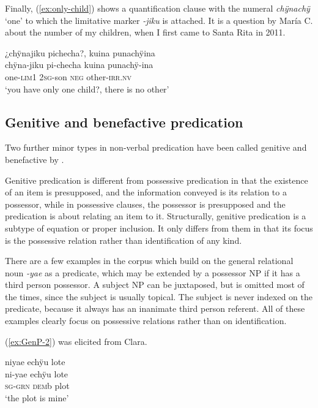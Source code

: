 Finally, (\ref{ex:only-child}) shows a quantification clause with the numeral \textit{chÿnachÿ} ‘one’ to which the limitative marker \textit{-jiku} is attached. It is a question by María C. about the number of my children, when I first came to Santa Rita in 2011.

\ea\label{ex:only-child}
\begingl
\glpreamble ¿chÿnajiku pichecha?, kuina punachÿina\\
\gla chÿna-jiku pi-checha kuina punachÿ-ina\\
\glb one-\textsc{lim}1 2\textsc{sg}-son \textsc{neg} other-\textsc{irr.nv}\\
\glft ‘you have only one child?, there is no other’
\endgl
\trailingcitation{[uxx-p110825l.242-244]}
\xe
{}


\subsection{Genitive and benefactive predication}\label{sec:GenitiveBenfactivePreds}

Two further minor types in non-verbal predication have been called genitive and benefactive by \citet[248]{Dryer2007}.

Genitive predication is different from possessive predication in that the existence of an item is presupposed, and the information conveyed is its relation to a possessor, while in possessive clauses, the possessor is presupposed and the predication is about relating an item to it. Structurally, genitive predication is a subtype of equation or proper inclusion. It only differs from them in that its focus is the possessive relation rather than identification of any kind.

There are a few examples in the corpus which build on the general relational noun \textit{-yae} as a predicate, which may be extended by a possessor NP if it has a third person possessor. A subject NP can be juxtaposed, but is omitted most of the times, since the subject is usually topical. The subject is never indexed on the predicate, because it always has an inanimate third person referent. All of these examples clearly focus on possessive relations rather than on identification.

(\ref{ex:GenP-2}) was elicited from Clara.

\ea\label{ex:GenP-2}
\begingl
\glpreamble niyae echÿu lote\\
\gla ni-yae echÿu lote\\
\textsc{sg}-\textsc{grn} \textsc{dem}b plot\\
\glft ‘the plot is mine’
\endgl
\trailingcitation{[cux-c120414ls-1.104]}
\xe

